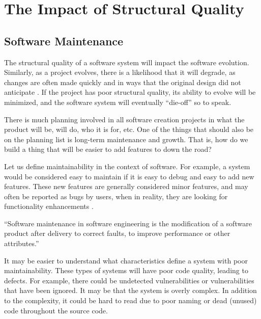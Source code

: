
\section{The Impact of Structural Quality} \label{sectionMyIdea}

\subsection{Software Maintenance} \label{subSoftwareMaintenance}

The structural quality of a software system will impact the software evolution. Similarly, as a project evolves, there is a likelihood that it will degrade, as changes are often made quickly and in ways that the original design did not anticipate \cite{martin:2000}. If the project has poor structural quality, its ability to evolve will be minimized, and the software system will eventually ``die-off'' so to speak.

There is much planning involved in all software creation projects in what the product will be, will do, who it is for, etc. One of the things that should also be on the planning list is long-term maintenance and growth. That is, how do we build a thing that will be easier to add features to down the road?

Let us define maintainability in the context of software. For example, a system would be considered easy to maintain if it is easy to debug and easy to add new features. These new features are generally considered minor features, and may often be reported as bugs by users, when in reality, they are looking for functionality enhancements \cite{wiki:software-maintenance}.

\vspace{0.25cm}
\begin{displayquote}
  ``Software maintenance in software engineering is the modification of a software product after delivery to correct faults, to improve performance or other attributes.'' \cite{wiki:software-maintenance}
\end{displayquote}
\vspace{0.25cm}

It may be easier to understand what characteristics define a system with poor maintainability. These types of systems will have poor code quality, leading to defects. For example, there could be undetected vulnerabilities or vulnerabilities that have been ignored. It may be that the system is overly complex. In addition to the complexity, it could be hard to read due to poor naming or dead (unused) code throughout the source code.

